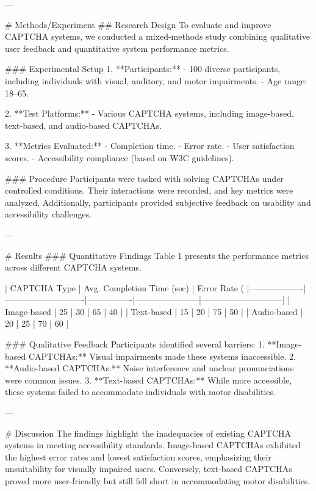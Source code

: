 ---

# Methods/Experiment  
## Research Design  
To evaluate and improve CAPTCHA systems, we conducted a mixed-methods study combining qualitative user feedback and quantitative system performance metrics.

### Experimental Setup  
1. **Participants:**  
   - 100 diverse participants, including individuals with visual, auditory, and motor impairments.  
   - Age range: 18–65.  

2. **Test Platforms:**  
   - Various CAPTCHA systems, including image-based, text-based, and audio-based CAPTCHAs.

3. **Metrics Evaluated:**  
   - Completion time.  
   - Error rate.  
   - User satisfaction scores.  
   - Accessibility compliance (based on W3C guidelines).  

### Procedure  
Participants were tasked with solving CAPTCHAs under controlled conditions. Their interactions were recorded, and key metrics were analyzed. Additionally, participants provided subjective feedback on usability and accessibility challenges.

---

# Results  
### Quantitative Findings  
Table 1 presents the performance metrics across different CAPTCHA systems.

| CAPTCHA Type      | Avg. Completion Time (sec) | Error Rate (%
|-------------------|----------------------------|----------------|-----------------------|-----------------------------|
| Image-based       | 25                         | 30             | 65                    | 40                          |
| Text-based        | 15                         | 20             | 75                    | 50                          |
| Audio-based       | 20                         | 25             | 70                    | 60                          |

### Qualitative Feedback  
Participants identified several barriers:  
1. **Image-based CAPTCHAs:** Visual impairments made these systems inaccessible.  
2. **Audio-based CAPTCHAs:** Noise interference and unclear pronunciations were common issues.  
3. **Text-based CAPTCHAs:** While more accessible, these systems failed to accommodate individuals with motor disabilities.

---

# Discussion  
The findings highlight the inadequacies of existing CAPTCHA systems in meeting accessibility standards. Image-based CAPTCHAs exhibited the highest error rates and lowest satisfaction scores, emphasizing their unsuitability for visually impaired users. Conversely, text-based CAPTCHAs proved more user-friendly but still fell short in accommodating motor disabilities.

